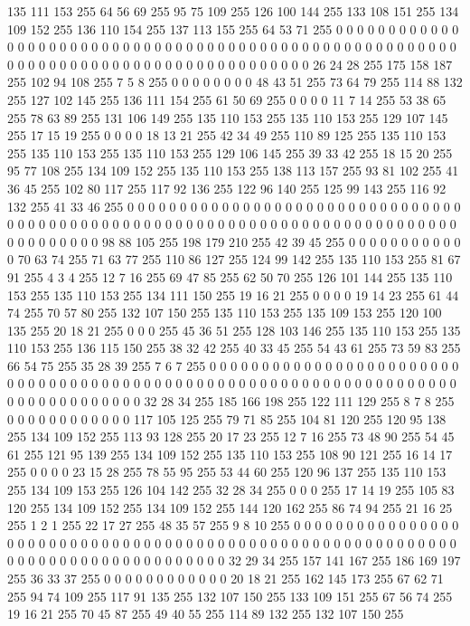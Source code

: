 135 111 153 255 64 56 69 255 95 75 109 255 126 100 144 255 133 108 151 255 134 109 152 255 136 110 154 255 137 113 155 255 64 53 71 255 0 0 0 0 0 0 0 0 0 0 0 0 0 0 0 0 0 0 0 0 0 0 0 0 0 0 0 0
0 0 0 0 0 0 0 0 0 0 0 0 0 0 0 0 0 0 0 0 0 0 0 0 0 0 0 0 0 0 0 0 0 0 0 0 0 0 0 0 0 0 0 0 0 0 0 0 0 0 0 0 0 0 0 0 26 24 28 255 175 158 187 255
102 94 108 255 7 5 8 255 0 0 0 0 0 0 0 0 48 43 51 255 73 64 79 255 114 88 132 255 127 102 145 255 136 111 154 255 61 50 69 255 0 0 0 0 11 7 14 255 53 38 65 255 78 63 89 255 131 106 149 255 135 110 153 255
135 110 153 255 129 107 145 255 17 15 19 255 0 0 0 0 18 13 21 255 42 34 49 255 110 89 125 255 135 110 153 255 135 110 153 255 135 110 153 255 129 106 145 255 39 33 42 255 18 15 20 255 95 77 108 255 134 109 152 255 135 110 153 255
138 113 157 255 93 81 102 255 41 36 45 255 102 80 117 255 117 92 136 255 122 96 140 255 125 99 143 255 116 92 132 255 41 33 46 255 0 0 0 0 0 0 0 0 0 0 0 0 0 0 0 0 0 0 0 0 0 0 0 0 0 0 0 0
0 0 0 0 0 0 0 0 0 0 0 0 0 0 0 0 0 0 0 0 0 0 0 0 0 0 0 0 0 0 0 0 0 0 0 0 0 0 0 0 0 0 0 0 0 0 0 0 0 0 0 0 0 0 0 0 98 88 105 255 198 179 210 255
42 39 45 255 0 0 0 0 0 0 0 0 0 0 0 0 70 63 74 255 71 63 77 255 110 86 127 255 124 99 142 255 135 110 153 255 81 67 91 255 4 3 4 255 12 7 16 255 69 47 85 255 62 50 70 255 126 101 144 255 135 110 153 255
135 110 153 255 134 111 150 255 19 16 21 255 0 0 0 0 19 14 23 255 61 44 74 255 70 57 80 255 132 107 150 255 135 110 153 255 135 109 153 255 120 100 135 255 20 18 21 255 0 0 0 255 45 36 51 255 128 103 146 255 135 110 153 255
135 110 153 255 136 115 150 255 38 32 42 255 40 33 45 255 54 43 61 255 73 59 83 255 66 54 75 255 35 28 39 255 7 6 7 255 0 0 0 0 0 0 0 0 0 0 0 0 0 0 0 0 0 0 0 0 0 0 0 0 0 0 0 0
0 0 0 0 0 0 0 0 0 0 0 0 0 0 0 0 0 0 0 0 0 0 0 0 0 0 0 0 0 0 0 0 0 0 0 0 0 0 0 0 0 0 0 0 0 0 0 0 0 0 0 0 32 28 34 255 185 166 198 255 122 111 129 255
8 7 8 255 0 0 0 0 0 0 0 0 0 0 0 0 117 105 125 255 79 71 85 255 104 81 120 255 120 95 138 255 134 109 152 255 113 93 128 255 20 17 23 255 12 7 16 255 73 48 90 255 54 45 61 255 121 95 139 255 134 109 152 255
135 110 153 255 108 90 121 255 16 14 17 255 0 0 0 0 23 15 28 255 78 55 95 255 53 44 60 255 120 96 137 255 135 110 153 255 134 109 153 255 126 104 142 255 32 28 34 255 0 0 0 255 17 14 19 255 105 83 120 255 134 109 152 255
134 109 152 255 144 120 162 255 86 74 94 255 21 16 25 255 1 2 1 255 22 17 27 255 48 35 57 255 9 8 10 255 0 0 0 0 0 0 0 0 0 0 0 0 0 0 0 0 0 0 0 0 0 0 0 0 0 0 0 0 0 0 0 0
0 0 0 0 0 0 0 0 0 0 0 0 0 0 0 0 0 0 0 0 0 0 0 0 0 0 0 0 0 0 0 0 0 0 0 0 0 0 0 0 0 0 0 0 0 0 0 0 32 29 34 255 157 141 167 255 186 169 197 255 36 33 37 255
0 0 0 0 0 0 0 0 0 0 0 0 20 18 21 255 162 145 173 255 67 62 71 255 94 74 109 255 117 91 135 255 132 107 150 255 133 109 151 255 67 56 74 255 19 16 21 255 70 45 87 255 49 40 55 255 114 89 132 255 132 107 150 255
